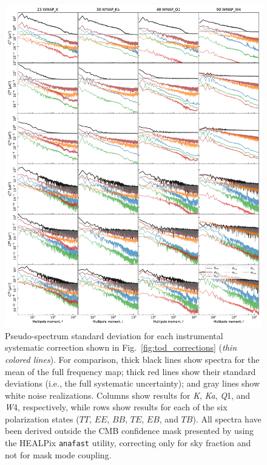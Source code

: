 \documentclass[twocolumn]{../../common/aa}
\newcommand{\K}[0]{\textit K}
\newcommand{\Ka}[0]{\textit{Ka}}
\newcommand{\Q}[0]{\textit Q}
\newcommand{\W}[0]{\textit W}
\begin{document}
\begin{figure}
  \center	
   \includegraphics[width=0.95\linewidth]{figures/components_power_spectrum_std_masked_WMAP_new_rms.pdf}
  \caption{Pseudo-spectrum standard deviation for each instrumental
    systematic correction shown in
    Fig.~\ref{fig:tod_corrections} (\emph{thin
      colored lines}). For comparison, thick black lines show spectra
    for the mean of the full frequency map; thick red lines show their standard deviations (i.e., the full systematic uncertainty); and gray lines show white noise realizations.
    Columns show results for \K,
    \Ka, \Q1, and \W4, respectively, while rows show results for each of
    the six polarization states ($TT$, $EE$, $BB$, $TE$, $EB$, and
    $TB$). All spectra have been derived outside the CMB confidence
    mask presented by \citet{bp13} using the HEALPix \texttt{anafast}
    utility, correcting only for sky fraction and not for mask mode
    coupling. }
  \label{fig:corrmap_stddev}
\end{figure}
\end{document}
